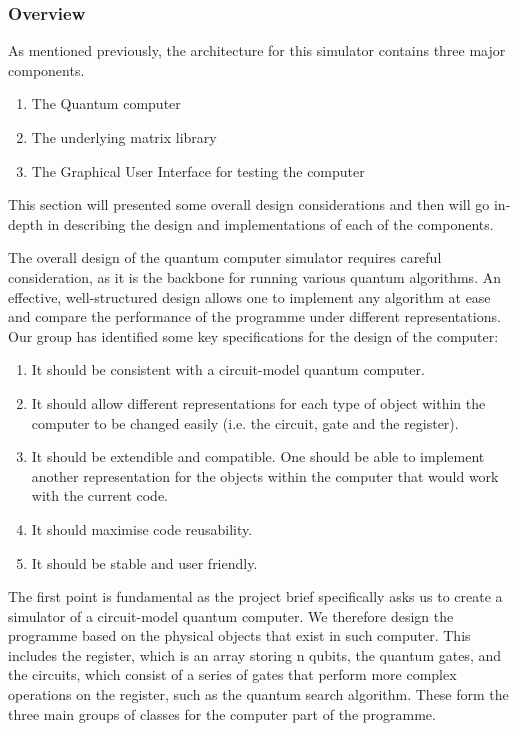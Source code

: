 \documentclass[bibliography=totocnumbered, 10pt]{article}
\theoremstyle{NoticeStyle}
\begin{document}
\subsubsection{Overview}
As mentioned previously, the architecture for this simulator contains three major components.
\begin{enumerate}
	\item The Quantum computer
	\item The underlying matrix library
	\item The Graphical User Interface for testing the computer
\end{enumerate}
This section will presented some overall design considerations and then will go in-depth in describing the design and implementations of each of the components.

The overall design of the quantum computer simulator requires careful consideration, as it is the backbone for running various quantum algorithms. An effective, well-structured design allows one to implement any algorithm at ease and compare the performance of the programme under different representations. Our group has identified some key specifications for the design of the computer: 
\begin{enumerate}
	\item It should be consistent with a circuit-model quantum computer. 
	\item It should allow different representations for each type of object within the computer to be changed easily (i.e. the circuit, gate and the register).
	\item It should be extendible and compatible. One should be able to implement another representation for the objects within the computer that would work with the current code.
	\item It should maximise code reusability.
	\item It should be stable and user friendly.
\end{enumerate}
The first point is fundamental as the project brief specifically asks us to create a simulator of a circuit-model quantum computer. We therefore design the programme based on the physical objects that exist in such computer. This includes the register, which is an array storing n qubits, the quantum gates, and the circuits, which consist of a series of gates that perform more complex operations on the register, such as the quantum search algorithm. These form the three main groups of classes for the computer part of the programme. 
\end{document}
